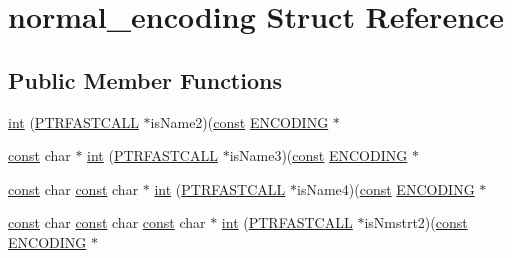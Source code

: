 \hypertarget{structnormal__encoding}{}\section{normal\+\_\+encoding Struct Reference}
\label{structnormal__encoding}
\subsection*{Public Member Functions}
\begin{DoxyCompactItemize}
\item 
\hyperlink{structnormal__encoding_a2b40cfcc1100731da4ebd8568554d31e}{int} (\hyperlink{expat_2lib_2internal_8h_a6e4a6029ec5edd313bac38ae0e17db07}{P\+T\+R\+F\+A\+S\+T\+C\+A\+LL} $\ast$is\+Name2)(\hyperlink{getopt1_8c_a2c212835823e3c54a8ab6d95c652660e}{const} \hyperlink{xmltok_8h_a46834e73898ebab478b38f817a8c6fc0}{E\+N\+C\+O\+D\+I\+NG} $\ast$
\item 
\hyperlink{getopt1_8c_a2c212835823e3c54a8ab6d95c652660e}{const} char $\ast$ \hyperlink{structnormal__encoding_a96eebaff69152a39fef40ed95479dd9f}{int} (\hyperlink{expat_2lib_2internal_8h_a6e4a6029ec5edd313bac38ae0e17db07}{P\+T\+R\+F\+A\+S\+T\+C\+A\+LL} $\ast$is\+Name3)(\hyperlink{getopt1_8c_a2c212835823e3c54a8ab6d95c652660e}{const} \hyperlink{xmltok_8h_a46834e73898ebab478b38f817a8c6fc0}{E\+N\+C\+O\+D\+I\+NG} $\ast$
\item 
\hyperlink{getopt1_8c_a2c212835823e3c54a8ab6d95c652660e}{const} char \hyperlink{getopt1_8c_a2c212835823e3c54a8ab6d95c652660e}{const} char $\ast$ \hyperlink{structnormal__encoding_a1995414445f496fc9c003e7007068caa}{int} (\hyperlink{expat_2lib_2internal_8h_a6e4a6029ec5edd313bac38ae0e17db07}{P\+T\+R\+F\+A\+S\+T\+C\+A\+LL} $\ast$is\+Name4)(\hyperlink{getopt1_8c_a2c212835823e3c54a8ab6d95c652660e}{const} \hyperlink{xmltok_8h_a46834e73898ebab478b38f817a8c6fc0}{E\+N\+C\+O\+D\+I\+NG} $\ast$
\item 
\hyperlink{getopt1_8c_a2c212835823e3c54a8ab6d95c652660e}{const} char \hyperlink{getopt1_8c_a2c212835823e3c54a8ab6d95c652660e}{const} char \hyperlink{getopt1_8c_a2c212835823e3c54a8ab6d95c652660e}{const} char $\ast$ \hyperlink{structnormal__encoding_a6e48219641e16ad73323832b991391ed}{int} (\hyperlink{expat_2lib_2internal_8h_a6e4a6029ec5edd313bac38ae0e17db07}{P\+T\+R\+F\+A\+S\+T\+C\+A\+LL} $\ast$is\+Nmstrt2)(\hyperlink{getopt1_8c_a2c212835823e3c54a8ab6d95c652660e}{const} \hyperlink{xmltok_8h_a46834e73898ebab478b38f817a8c6fc0}{E\+N\+C\+O\+D\+I\+NG} $\ast$
\item 

\end{DoxyCompactItemize}
